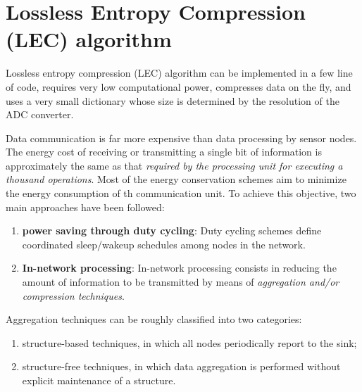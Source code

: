 \chapter{Lossless Entropy Compression (LEC) algorithm}

Lossless entropy compression (LEC) algorithm can be implemented in \textcolor[rgb]{1,0,0}{a few line of code}, requires \textcolor[rgb]{1,0,0}{very low computational power}, \textcolor[rgb]{1,0,0}{compresses data on the fly}, and \textcolor[rgb]{1,0,0}{uses a very small dictionary whose size is determined by the resolution of the ADC converter}. 

Data communication is far more expensive than data processing by sensor nodes. The energy cost of receiving or transmitting a single bit of information is approximately the same as that \emph{\textcolor[rgb]{1,0,0}{required by the processing unit for executing a thousand operations}}. Most of the energy conservation schemes aim to minimize the energy consumption of th communication unit. To achieve this objective, two main approaches have been followed:
\begin{enumerate}
    \item \textbf{\textcolor[rgb]{1,0,0}{power saving through duty cycling}}: Duty cycling schemes define coordinated sleep/wakeup schedules among nodes in the network. \cite{Anastasi2009}
    \item \textbf{\textcolor[rgb]{1,0,0}{In-network processing}}: In-network processing consists in reducing the amount of information to be transmitted by means of \emph{\textcolor[rgb]{1,0,0}{aggregation and/or compression techniques}}. 
\end{enumerate}

Aggregation techniques can be roughly classified into two categories: 
\begin{enumerate}
    \item structure-based techniques, in which all nodes periodically report to the sink;
    \item structure-free techniques, in which data aggregation is performed without explicit maintenance of a structure.
\end{enumerate}

